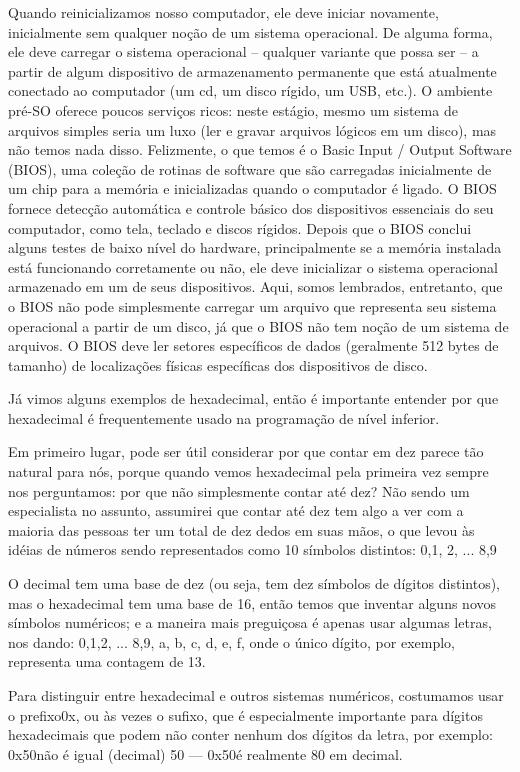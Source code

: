 Quando reinicializamos nosso computador, ele deve iniciar novamente, inicialmente sem qualquer noção de um sistema operacional. De alguma forma, ele deve carregar o sistema operacional – qualquer variante que possa ser – a partir de algum dispositivo de armazenamento permanente que está atualmente conectado ao computador (um cd, um disco rígido, um USB, etc.). O ambiente pré-SO oferece poucos serviços ricos: neste estágio, mesmo um sistema de arquivos simples seria um luxo (ler e gravar arquivos lógicos em um disco), mas não temos nada disso. Felizmente, o que temos é o Basic Input / Output Software (BIOS), uma coleção de rotinas de software que são carregadas inicialmente de um chip para a memória e inicializadas quando o computador é ligado. O BIOS fornece detecção automática e controle básico dos dispositivos essenciais do seu computador, como tela, teclado e discos rígidos. Depois que o BIOS conclui alguns testes de baixo nível do hardware, principalmente se a memória instalada está funcionando corretamente ou não, ele deve inicializar o sistema operacional armazenado em um de seus dispositivos. Aqui, somos lembrados, entretanto, que o BIOS não pode simplesmente carregar um arquivo que representa seu sistema operacional a partir de um disco, já que o BIOS não tem noção de um sistema de arquivos. O BIOS deve ler setores específicos de dados (geralmente 512 bytes de tamanho) de localizações físicas específicas dos dispositivos de disco.

Já vimos alguns exemplos de hexadecimal, então é importante entender por que hexadecimal é frequentemente usado na programação de nível inferior.

Em primeiro lugar, pode ser útil considerar por que contar em dez parece tão natural para nós, porque quando vemos hexadecimal pela primeira vez sempre nos perguntamos: por que não simplesmente contar até dez? Não sendo um especialista no assunto, assumirei que contar até dez tem algo a ver com a maioria das pessoas ter um total de dez dedos em suas mãos, o que levou às idéias de números sendo representados como 10 símbolos distintos: 0,1, 2, ... 8,9

O decimal tem uma base de dez (ou seja, tem dez símbolos de dígitos distintos), mas o hexadecimal tem uma base de 16, então temos que inventar alguns novos símbolos numéricos; e a maneira mais preguiçosa é apenas usar algumas letras, nos dando: 0,1,2, ... 8,9, a, b, c, d, e, f, onde o único dígito, por exemplo, representa uma contagem de 13.

Para distinguir entre hexadecimal e outros sistemas numéricos, costumamos usar o prefixo0x, ou às vezes o sufixo, que é especialmente importante para dígitos hexadecimais que podem não conter nenhum dos dígitos da letra, por exemplo: 0x50não é igual (decimal) 50 --- 0x50é realmente 80 em decimal.


